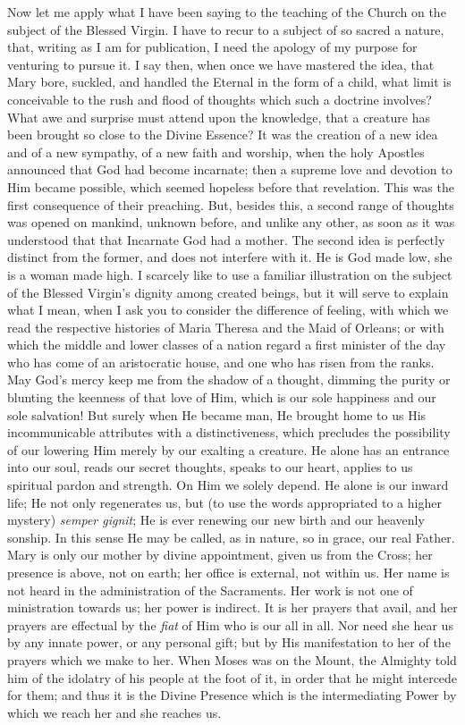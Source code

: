 Now let me apply what I have been saying to the teaching of the
Church on the subject of the Blessed Virgin. I have to recur to a
subject of so sacred a nature, that, writing as I am for publication, I
need the apology of my purpose for venturing to pursue it. I say then,
when once we have mastered the idea, that Mary bore, suckled, and
handled the Eternal in the form of a child, what limit is conceivable to
the rush and flood of thoughts which such a doctrine involves? What awe
and surprise must attend upon the knowledge, that a creature has been
brought so close to the Divine Essence? It was the creation of a new
idea and of a new sympathy, of a new faith and worship, when the holy
Apostles announced that God had become incarnate; then a supreme love
and devotion to Him became possible, which seemed hopeless before that
revelation. This was the first consequence of their preaching. But,
besides this, a second range of thoughts was opened on mankind, unknown
before, and unlike any other, as soon as it was understood that that
Incarnate God had a mother. The second idea is perfectly distinct from
the former, and does not interfere with it. He is God made low, she is a
woman made high. I scarcely like to use a familiar illustration on the
subject of the Blessed Virgin's dignity among created beings, but it
will serve to explain what I mean, when I ask you to consider the
difference of feeling, with which we read the respective histories of
Maria Theresa and the Maid of Orleans; or with which the middle and
lower classes of a nation regard a first minister of the day who has
come of an aristocratic house, and one who has risen from the ranks. May
God's mercy keep me from the shadow of a thought, dimming the purity or
blunting the keenness of that love of Him, which is our sole happiness
and our sole salvation! But surely when He became man, He brought home
to us His incommunicable attributes with a distinctiveness, which
precludes the possibility of our lowering Him merely by our exalting a
creature. He alone has an entrance into our soul, reads our secret
thoughts, speaks to our heart, applies to us spiritual pardon and
strength. On Him we solely depend. He alone is our inward life; He not
only regenerates us, but (to use the words appropriated to a higher
mystery) \emph{semper gignit}; He is ever renewing our new birth and our
heavenly sonship. In this sense He may be called, as in nature, so in
grace, our real Father. Mary is only our mother by divine appointment,
given us from the Cross; her presence is above, not on earth; her office
is external, not within us. Her name is not heard in the administration
of the Sacraments. Her work is not one of ministration towards us; her
power is indirect. It is her prayers that avail, and her prayers are
effectual by the \emph{fiat} of Him who is our all in all. Nor need she
hear us by any innate power, or any personal gift; but by His
manifestation to her of the prayers which we make to her. When Moses was
on the Mount, the Almighty told him of the idolatry of his people at the
foot of it, in order that he might intercede for them; and thus it is
the Divine Presence which is the intermediating Power by which we reach
her and she reaches us.

